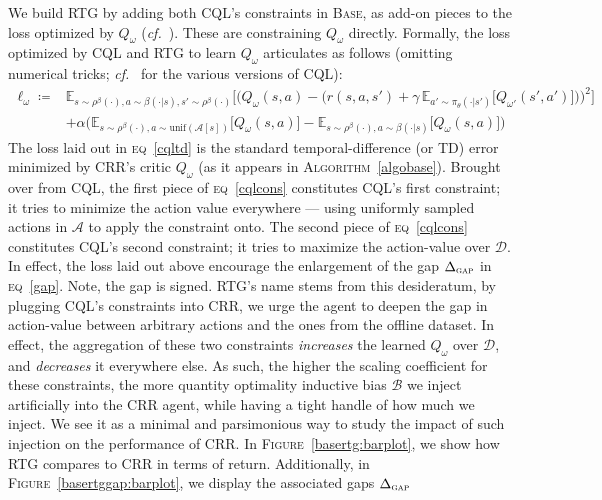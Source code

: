 We build RTG by adding both CQL's constraints in \textsc{Base}, as
add-on pieces to the loss optimized by $Q_\omega$ (\textit{cf.}~\cite{Kumar2020-zb}).
These are constraining $Q_\omega$ directly.
Formally, the loss optimized by CQL and RTG to learn $Q_\omega$ articulates as follows
(omitting numerical tricks; \textit{cf.}~\cite{Kumar2020-zb} for the various versions of CQL):
\begin{align}
\ell_\omega
\coloneqq
&\mathbb{E}_{s \sim \rho^\beta(\cdot), a \sim \beta(\cdot | s), s' \sim \rho^\beta(\cdot)}
\bigg[
\Big(
Q_\omega(s,a) -
\big(
r(s, a, s') + \gamma \, \mathbb{E}_{a' \sim \pi_\theta(\cdot | s')}
\big[
Q_{\omega'}(s',a')
\big]
\big)
\Big)^2
\bigg]
\label{cqltd}
\\
&+ \alpha
\Big(
\mathbb{E}_{s \sim \rho^\beta(\cdot), a \sim \text{unif}(\mathcal{A}[s])}
\big[
Q_\omega(s,a)
\big]
-
\mathbb{E}_{s \sim \rho^\beta(\cdot), a \sim \beta(\cdot | s)}
\big[
Q_\omega(s,a)
\big]
\Big)
\label{cqlcons}
\end{align}
The loss laid out in \textsc{eq}~\ref{cqltd} is the standard temporal-difference (or TD) error minimized
by CRR's critic $Q_\omega$ (as it appears in \textsc{Algorithm}~\ref{algobase}).
Brought over from CQL, the first piece of \textsc{eq}~\ref{cqlcons}
constitutes CQL's first constraint; it
tries to minimize the action value everywhere --- using uniformly sampled actions in $\mathcal{A}$
to apply the constraint onto.
The second piece of \textsc{eq}~\ref{cqlcons}
constitutes CQL's second constraint; it
tries to maximize the action-value over $\mathcal{D}$.
In effect, the loss laid out above
encourage the enlargement of the gap $\Delta_\textsc{gap}$ in \textsc{eq}~\ref{gap}.
Note, the gap  is signed.
RTG's name stems from this desideratum, by plugging CQL's constraints into CRR,
we urge the agent to deepen the gap in action-value between arbitrary actions and the ones from the offline dataset.
In effect, the aggregation of these two constraints \textit{increases} the learned $Q_\omega$ over $\mathcal{D}$,
and \textit{decreases} it everywhere else.
As such, the higher the scaling coefficient for these constraints, the more quantity optimality inductive bias
$\mathcal{B}$ we inject artificially into the CRR agent, while having a tight handle of how much we inject.
We see it as a minimal and parsimonious way to study the impact of such injection on the performance of CRR.
In \textsc{Figure}~\ref{basertg:barplot}, we show how RTG compares to CRR in terms of return.
Additionally, in \textsc{Figure}~\ref{basertggap:barplot}, we display the associated gaps $\Delta_\textsc{gap}$

